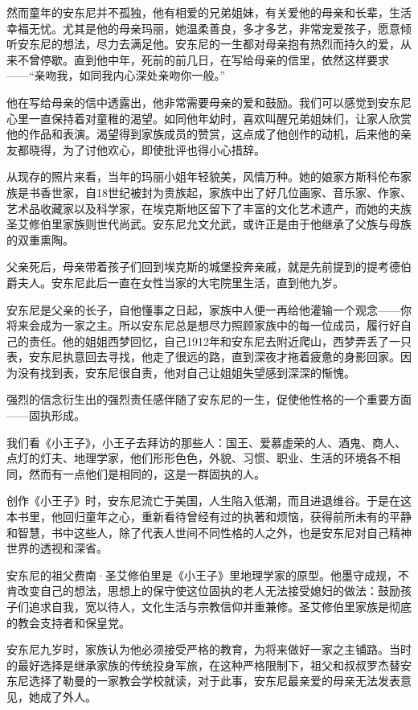 然而童年的安东尼并不孤独，他有相爱的兄弟姐妹，有关爱他的母亲和长辈，生活幸福无忧。尤其是他的母亲玛丽，她温柔善良，多才多艺，非常宠爱孩子，愿意倾听安东尼的想法，尽力去满足他。安东尼的一生都对母亲抱有热烈而持久的爱，从来不曾停歇。直到他中年，死前的前几日，在写给母亲的信里，依然这样要求------“亲吻我，如同我内心深处亲吻你一般。”

他在写给母亲的信中透露出，他非常需要母亲的爱和鼓励。我们可以感觉到安东尼心里一直保持着对童稚的渴望。如同他年幼时，喜欢叫醒兄弟姐妹们，让家人欣赏他的作品和表演。渴望得到家族成员的赞赏，这点成了他创作的动机，后来他的亲友都晓得，为了讨他欢心，即使批评也得小心措辞。

从现存的照片来看，当年的玛丽小姐年轻貌美，风情万种。她的娘家方斯科伦布家族是书香世家，自18世纪被封为贵族起，家族中出了好几位画家、音乐家、作家、艺术品收藏家以及科学家，在埃克斯地区留下了丰富的文化艺术遗产，而她的夫族圣艾修伯里家族则世代尚武。安东尼允文允武，或许正是由于他继承了父族与母族的双重熏陶。

父亲死后，母亲带着孩子们回到埃克斯的城堡投奔亲戚，就是先前提到的提考德伯爵夫人。安东尼此后一直在女性当家的大宅院里生活，直到他九岁。

安东尼是父亲的长子，自他懂事之日起，家族中人便一再给他灌输一个观念------你将来会成为一家之主。所以安东尼总是想尽力照顾家族中的每一位成员，履行好自己的责任。他的姐姐西梦回忆，自己1912年和安东尼去附近爬山，西梦弄丢了一只表，安东尼执意回去寻找，他走了很远的路，直到深夜才拖着疲惫的身影回家。因为没有找到表，安东尼很自责，他对自己让姐姐失望感到深深的惭愧。

强烈的信念衍生出的强烈责任感伴随了安东尼的一生，促使他性格的一个重要方面------固执形成。

我们看《小王子》，小王子去拜访的那些人：国王、爱慕虚荣的人、酒鬼、商人、点灯的灯夫、地理学家，他们形形色色，外貌、习惯、职业、生活的环境各不相同，然而有一点他们是相同的，这是一群固执的人。

创作《小王子》时，安东尼流亡于美国，人生陷入低潮，而且进退维谷。于是在这本书里，他回归童年之心，重新看待曾经有过的执著和烦恼，获得前所未有的平静和智慧，书中这些人，除了代表人世间不同性格的人之外，也是安东尼对自己精神世界的透视和深省。

安东尼的祖父费南·圣艾修伯里是《小王子》里地理学家的原型。他墨守成规，不肯改变自己的想法，思想上的保守使这位固执的老人无法接受媳妇的做法：鼓励孩子们追求自我，宽以待人，文化生活与宗教信仰并重兼修。圣艾修伯里家族是彻底的教会支持者和保皇党。

安东尼九岁时，家族认为他必须接受严格的教育，为将来做好一家之主铺路。当时的最好选择是继承家族的传统投身军旅，在这种严格限制下，祖父和叔叔罗杰替安东尼选择了勒曼的一家教会学校就读，对于此事，安东尼最亲爱的母亲无法发表意见，她成了外人。

